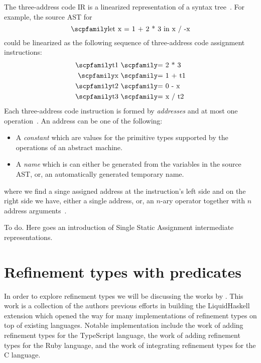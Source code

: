 \documentclass[
  oneside,
  english,
  coorientadorbanca,
  noabntexcite
]{ufsc-thesis-rn46-2019}
\newcommand{\code}[1]{\text{\scpfamily\setlength\spaceskip{0.35em}#1}}
\begin{document}
The three-address code IR is a linearized representation of a syntax tree~\cite{Aho:2006:CPT:1177220}.
For example, the source AST for
\begin{equation*}
  \code{let x = 1 + 2 * 3 in x / -x}
\end{equation*}
could be linearized as the following sequence of three-address code assignment instructions:
\begin{align*}
  \code{t1} \  & \code{= 2 * 3}  \\
  \code{x}  \  & \code{= 1 + t1} \\
  \code{t2} \  & \code{= 0 - x}  \\
  \code{t3} \  & \code{= x / t2}
\end{align*}
Each three-address code instruction is formed by \textit{addresses} and at most one operation~\cite{Aho:2006:CPT:1177220}.
An address can be one of the following:
\begin{itemize}
  \item A \textit{constant} \code{c} which are values for the primitive types supported by the operations of an abstract machine.

  \item A \textit{name} \code{n} which is can either be generated from the variables in the source AST, or, an automatically generated temporary name.
\end{itemize}

where we find a singe assigned address at the instruction's left side and on the right side we have, either a single address, or, an $n$-ary operator together with $n$ address arguments~\cite{Aho:2006:CPT:1177220}.

To do. Here goes an introduction of Single Static Assignment intermediate representations.

\chapter{Refinement types with predicates}\label{ch:refinement_types}

In order to explore refinement types we will be discussing the works by \textcite{jhala2020tutorial}.
This work is a collection of the authors previous efforts in \textcite{vazou2014liquidhaskell} building the LiquidHaskell extension which opened the way for many implementations of refinement types on top of existing languages.
Notable implementation include the work of \textcite{vekris2016refinementtypescript} adding refinement types for the TypeScript language, the work of \textcite{vazou2018refinementruby} adding refinement types for the Ruby language, and the work of \textcite{sammler2021refinedc} integrating refinement types for the C language.
\end{document}
